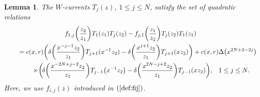 \documentclass[pdftex]{sigma}
\numberwithin{equation}{section}
\newtheorem{Lemma}[Theorem]{Lemma}
\begin{document}
\begin{Lemma}\label{lemma:4-6}
The $W$-currents $T_j(z)$, $1\leq j \leq N$,
satisfy the set of quadratic relations
\begin{gather}
f_{1,j}\bigg(\frac{z_2}{z_1}\bigg)T_1(z_1)T_j(z_2)-
f_{j,1}\bigg(\frac{z_1}{z_2}\bigg)T_j(z_2)T_1(z_1)\notag
\\ \qquad
{}=c(x,r)\bigg(\delta\bigg(\frac{x^{-j-1}z_2}{z_1}\bigg)T_{j+1}(x^{-1}z_2)
-\delta\bigg(\frac{x^{j+1}z_2}{z_1}\bigg)T_{j+1}(x z_2)\bigg)
+c(x,r)\Delta\big(x^{2N+2-2j}\big)\notag
\\ \qquad\phantom{=}
{}\times\!\bigg(\!\delta\bigg(\frac{x^{-2N+j-2}z_2}{z_1}\bigg)T_{j-1}\big(x^{-1}z_2\big)
-\delta\bigg(\frac{x^{2N-j+2}z_2}{z_1}\bigg)T_{j-1}(x z_2)\bigg),
\quad\!
1\leq j \leq N.\!\!
\label{eqn:quadratic2}
\end{gather}
Here, we use $f_{i,j}(z)$ {introduced} in $(\ref{def:fij})$.
\end{Lemma}
\end{document}

